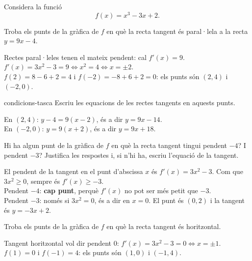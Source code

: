 Considera la funció
\[
f(x)=x^3-3x+2 .
\]

\begin{apartats}

Troba els punts de la gràfica de $f$ en què la recta tangent és paral·lela a la recta
$y=9x-4$.

\begin{solucio}
Rectes paral·leles tenen el mateix pendent: cal $f'(x)=9$.\\
$f'(x)=3x^2-3=9\iff x^2=4\iff x=\pm2$.\\
$f(2)=8-6+2=4$ i $f(-2)=-8+6+2=0$: els punts són $\boxed{(2,4)}$ i $\boxed{(-2,0)}$.
\end{solucio}

\begin{tria}{condicions-tasca}
Escriu les equacions de les rectes tangents en aquests punts.

\begin{solucio}
En $(2,4)$: $y-4=9(x-2)$, és a dir $y=9x-14$.\\
En $(-2,0)$: $y=9(x+2)$, és a dir $y=9x+18$.
\end{solucio}

Hi ha algun punt de la gràfica de $f$ en què la recta tangent tingui pendent $-4$? I pendent
$-3$? Justifica les respostes i, si n'hi ha, escriu l'equació de la tangent.

\begin{solucio}
El pendent de la tangent en el punt d'abscissa $x$ és $f'(x)=3x^2-3$. Com que $3x^2\ge0$,
sempre és $f'(x)\ge-3$.\\
Pendent $-4$: \textbf{cap punt}, perquè $f'(x)$ no pot ser més petit que $-3$.\\
Pendent $-3$: només si $3x^2=0$, és a dir en $x=0$. El punt és $(0,2)$ i la tangent és $y=-3x+2$.
\end{solucio}
\end{tria}

\begin{nomesllarg}
Troba els punts de la gràfica de $f$ en què la recta tangent és horitzontal.

\begin{solucio}
Tangent horitzontal vol dir pendent $0$: $f'(x)=3x^2-3=0\iff x=\pm1$.\\
$f(1)=0$ i $f(-1)=4$: els punts són $(1,0)$ i $(-1,4)$.
\end{solucio}
\end{nomesllarg}

\end{apartats}
